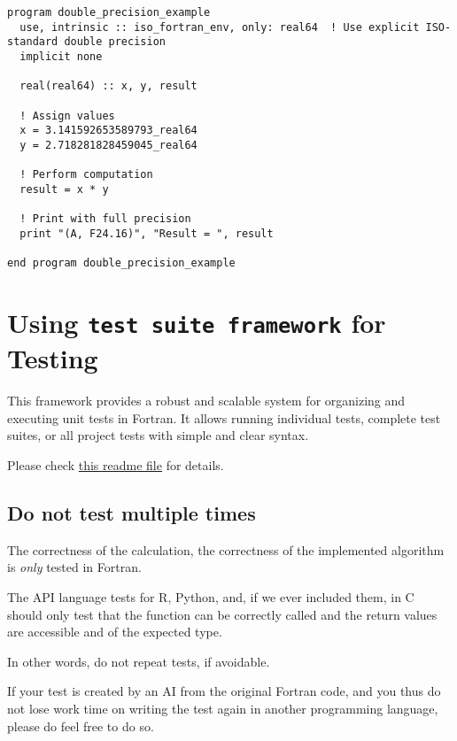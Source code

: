 \documentclass{article}
\begin{document}
\begin{verbatim}
program double_precision_example
  use, intrinsic :: iso_fortran_env, only: real64  ! Use explicit ISO-standard double precision
  implicit none

  real(real64) :: x, y, result

  ! Assign values
  x = 3.141592653589793_real64
  y = 2.718281828459045_real64

  ! Perform computation
  result = x * y

  ! Print with full precision
  print "(A, F24.16)", "Result = ", result

end program double_precision_example
\end{verbatim}

\section{Using \texttt{test suite framework} for Testing}

This framework provides a robust and scalable system for organizing and executing unit tests in Fortran. It allows running individual tests, complete test suites, or all project tests with simple and clear syntax.

\noindent Please check \href{https://gitlab.rlp.net/a.hallab/tensor-omics/-/tree/main/test?ref_type=heads}{this readme file} for details.

\subsection{Do not test multiple times}

The correctness of the calculation, the correctness of the implemented algorithm is \emph{only} tested in Fortran.

\noindent The API language tests for R, Python, and, if we ever included them, in C should only test that the function can be correctly called and the return values are accessible and of the expected type.

\noindent In other words, do not repeat tests, if avoidable.

\noindent If your test is created by an AI from the original Fortran code, and you thus do not lose work time on writing the test again in another programming language, please do feel free to do so.
\end{document}
